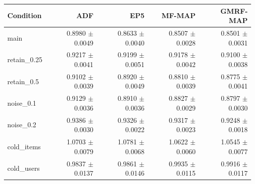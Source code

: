 \begin{tabular}{@{}lrrrr@{}}\toprule
Condition & ADF & EP5 & MF-MAP & GMRF-MAP\\\midrule
main & 0.8980 $\pm$ 0.0049 & 0.8633 $\pm$ 0.0040 & 0.8507 $\pm$ 0.0028 & 0.8501 $\pm$ 0.0031\\
retain\_0.25 & 0.9217 $\pm$ 0.0041 & 0.9199 $\pm$ 0.0051 & 0.9178 $\pm$ 0.0042 & 0.9100 $\pm$ 0.0038\\
retain\_0.5 & 0.9102 $\pm$ 0.0039 & 0.8920 $\pm$ 0.0049 & 0.8810 $\pm$ 0.0039 & 0.8775 $\pm$ 0.0041\\
noise\_0.1 & 0.9129 $\pm$ 0.0036 & 0.8910 $\pm$ 0.0036 & 0.8827 $\pm$ 0.0029 & 0.8797 $\pm$ 0.0030\\
noise\_0.2 & 0.9386 $\pm$ 0.0030 & 0.9326 $\pm$ 0.0022 & 0.9317 $\pm$ 0.0023 & 0.9248 $\pm$ 0.0018\\
cold\_items & 1.0703 $\pm$ 0.0079 & 1.0781 $\pm$ 0.0068 & 1.0622 $\pm$ 0.0060 & 1.0545 $\pm$ 0.0077\\
cold\_users & 0.9837 $\pm$ 0.0137 & 0.9861 $\pm$ 0.0146 & 0.9935 $\pm$ 0.0115 & 0.9916 $\pm$ 0.0117\\
\bottomrule\end{tabular}
